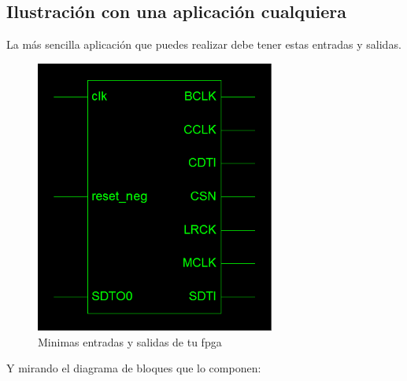 	\subsection{Ilustración con una aplicación cualquiera}
		La más sencilla aplicación que puedes realizar debe tener estas entradas y salidas.\\
		\begin{figure}[H]
\begin{center}
	\includegraphics[width=0.7\textwidth]{./entity_fpga}
\caption{Minimas entradas y salidas de tu fpga}
\end{center}
\end{figure}
Y mirando el diagrama de bloques que lo componen:
